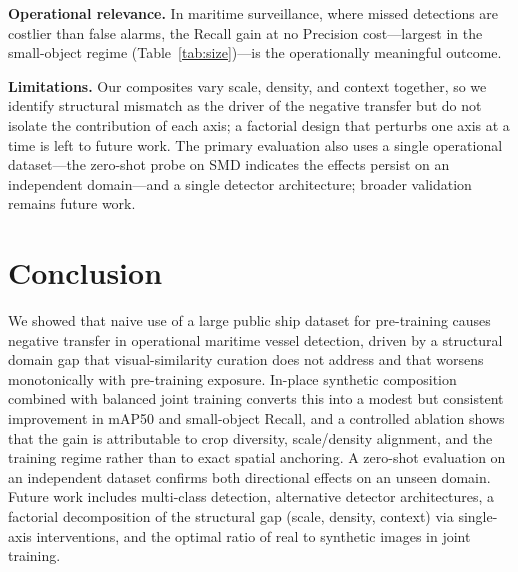 \documentclass[10pt,conference]{IEEEtran}
\newif\iffinal
\begin{document}
\textbf{Operational relevance.} In maritime surveillance, where missed detections
are costlier than false alarms, the Recall gain at no Precision cost---largest in
the small-object regime (Table~\ref{tab:size})---is the operationally meaningful
outcome.

\textbf{Limitations.} Our composites vary scale, density, and context together,
so we identify structural mismatch as the driver of the negative transfer but do
not isolate the contribution of each axis; a factorial design that perturbs one
axis at a time is left to future work. The primary evaluation also uses a single
operational dataset---the zero-shot probe on SMD indicates the effects persist on
an independent domain---and a single detector architecture; broader validation
remains future work.

\section{Conclusion}
We showed that naive use of a large public ship dataset for pre-training causes
negative transfer in operational maritime vessel detection, driven by a structural
domain gap that visual-similarity curation does not address and that worsens
monotonically with pre-training exposure. In-place synthetic composition combined
with balanced joint training converts this into a modest but consistent
improvement in mAP50 and small-object Recall, and a controlled ablation shows that
the gain is attributable to crop diversity, scale/density alignment, and the
training regime rather than to exact spatial anchoring. A zero-shot evaluation on
an independent dataset confirms both directional effects on an unseen domain.
Future work includes multi-class detection, alternative detector architectures, a factorial decomposition of the structural gap (scale, density, context) via single-axis interventions, and the optimal ratio of real to synthetic images in joint training.

\iffinal
\section*{Acknowledgment}
\fi



\end{document}
